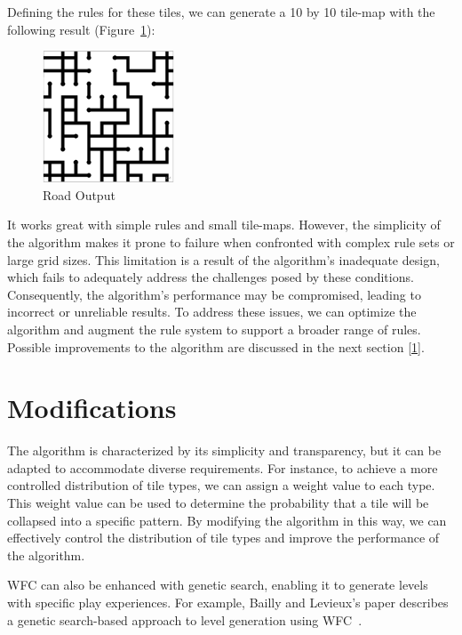 \documentclass[10pt,oneside,a4paper]{article}
\begin{document}
Defining the rules for these tiles, we can generate a 10 by 10 tile-map with the following result (Figure~\ref{fig:example1map}):

\begin{figure}[ht]
    \centering
    \includegraphics[width=0.35\textwidth]{figures/roads_output.png}
    \caption{Road Output}\label{fig:example1map}
\end{figure}

It works great with simple rules and small tile-maps. 
However, the simplicity of the algorithm makes it prone to failure when confronted with complex rule sets or large grid sizes.
This limitation is a result of the algorithm's inadequate design, which fails to adequately address the challenges posed by these conditions.
Consequently, the algorithm's performance may be compromised, leading to incorrect or unreliable results.
To address these issues, we can optimize the algorithm and augment the rule system to support a broader range of rules.
Possible improvements to the algorithm are discussed in the next section [\ref*{sec:modifications}].

\section{Modifications}\label{sec:modifications}
The algorithm is characterized by its simplicity and transparency, but it can be adapted to accommodate diverse requirements.
For instance, to achieve a more controlled distribution of tile types, we can assign a weight value to each type.
This weight value can be used to determine the probability that a tile will be collapsed into a specific pattern.
By modifying the algorithm in this way, we can effectively control the distribution of tile types and improve the performance of the algorithm.

WFC can also be enhanced with genetic search, enabling it to generate levels with specific play experiences.
For example, Bailly and Levieux's paper describes a genetic search-based approach to level generation using WFC~\cite{BL22}.
\end{document}
